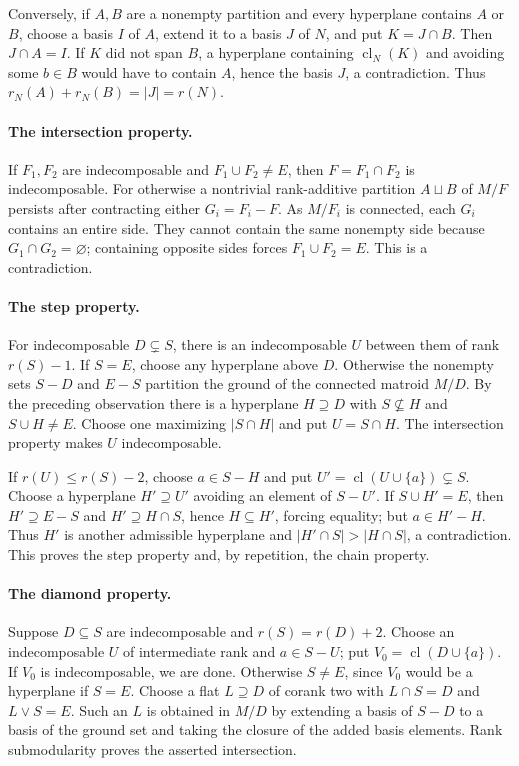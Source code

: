 \documentclass[11pt]{article}
\DeclareMathOperator{\cl}{cl}
\begin{document}
Conversely, if $A,B$ are a nonempty partition and every hyperplane contains $A$ or $B$, choose a basis $I$ of $A$, extend it to a basis $J$ of $N$, and put $K=J\cap B$. Then $J\cap A=I$. If $K$ did not span $B$, a hyperplane containing $\cl_N(K)$ and avoiding some $b\in B$ would have to contain $A$, hence the basis $J$, a contradiction. Thus $r_N(A)+r_N(B)=|J|=r(N)$.

\paragraph{The intersection property.}
If $F_1,F_2$ are indecomposable and $F_1\cup F_2\ne E$, then $F=F_1\cap F_2$ is indecomposable. For otherwise a nontrivial rank-additive partition $A\sqcup B$ of $M/F$ persists after contracting either $G_i=F_i-F$. As $M/F_i$ is connected, each $G_i$ contains an entire side. They cannot contain the same nonempty side because $G_1\cap G_2=\varnothing$; containing opposite sides forces $F_1\cup F_2=E$. This is a contradiction.

\paragraph{The step property.}
For indecomposable $D\subsetneq S$, there is an indecomposable $U$ between them of rank $r(S)-1$. If $S=E$, choose any hyperplane above $D$. Otherwise the nonempty sets $S-D$ and $E-S$ partition the ground of the connected matroid $M/D$. By the preceding observation there is a hyperplane $H\supseteq D$ with $S\not\subseteq H$ and $S\cup H\ne E$. Choose one maximizing $|S\cap H|$ and put $U=S\cap H$. The intersection property makes $U$ indecomposable.

If $r(U)\leq r(S)-2$, choose $a\in S-H$ and put $U'=\cl(U\cup\{a\})\subsetneq S$. Choose a hyperplane $H'\supseteq U'$ avoiding an element of $S-U'$. If $S\cup H'=E$, then $H'\supseteq E-S$ and $H'\supseteq H\cap S$, hence $H\subseteq H'$, forcing equality; but $a\in H'-H$. Thus $H'$ is another admissible hyperplane and $|H'\cap S|>|H\cap S|$, a contradiction. This proves the step property and, by repetition, the chain property.

\paragraph{The diamond property.}
Suppose $D\subseteq S$ are indecomposable and $r(S)=r(D)+2$. Choose an indecomposable $U$ of intermediate rank and $a\in S-U$; put $V_0=\cl(D\cup\{a\})$. If $V_0$ is indecomposable, we are done. Otherwise $S\ne E$, since $V_0$ would be a hyperplane if $S=E$. Choose a flat $L\supseteq D$ of corank two with $L\cap S=D$ and $L\vee S=E$. Such an $L$ is obtained in $M/D$ by extending a basis of $S-D$ to a basis of the ground set and taking the closure of the added basis elements. Rank submodularity proves the asserted intersection.
\end{document}
